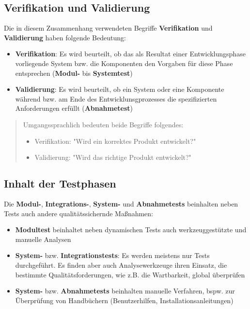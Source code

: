 \subsection*{Verifikation und Validierung}
Die in diesem Zusammenhang verwendeten Begriffe \textbf{Verifikation} und \textbf{Validierung} haben folgende Bedeutung:

\begin{itemize}
    \item \textbf{Verifikation}: Es wird beurteilt, ob das als Resultat einer Entwicklungsphase vorliegende System bzw. die Komponenten den Vorgaben für diese Phase entsprechen (\textbf{Modul-} bis \textbf{Systemtest})
    \item \textbf{Validierung}: Es wird beurteilt, ob ein System oder eine Komponente während bzw. am Ende des Entwicklunsgprozesses die spezifizierten Anforderungen erfüllt (\textbf{Abnahmetest})
\end{itemize}

\begin{tcolorbox}[colback=white]
    \blockquote[{\cite[554]{Bal08}}]{
    Umgangssprachlich bedeuten beide Begriffe folgendes:
    \begin{itemize}
        \item Verifikation: "Wird ein korrektes Produkt entwickelt?"
        \item Validierung: "Wird das richtige Produkt entwickelt?"
    \end{itemize}
    }
\end{tcolorbox}

\subsection*{Inhalt der Testphasen}
Die \textbf{Modul-}, \textbf{Integrations-}, \textbf{System-} und \textbf{Abnahmetests} beinhalten neben Tests auch andere qualitätssichernde Maßnahmen:

\begin{itemize}
    \item \textbf{Modultest} beinhaltet neben dynamischen Tests auch werkzeuggestützte und manuelle Analysen
    \item \textbf{System-} bzw. \textbf{Integrationstests}: Es werden meistens nur Tests durchgeführt. Es finden aber auch Analysewerkzeuge ihren Einsatz, die bestimmte Qualitätsforderungen, wie z.B. die Wartbarkeit, global überprüfen
    \item \textbf{System-} bzw. \textbf{Abnahmetests} beinhalten manuelle Verfahren, bspw. zur Überprüfung von Handbüchern (Benutzerhilfen, Installationsanleitungen)
\end{itemize}

